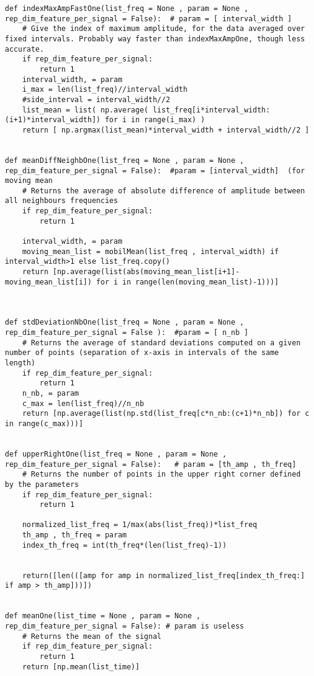\documentclass{article}
\begin{document}
\begin{lstlisting}
def indexMaxAmpFastOne(list_freq = None , param = None , rep_dim_feature_per_signal = False):  # param = [ interval_width ]
    # Give the index of maximum amplitude, for the data averaged over fixed intervals. Probably way faster than indexMaxAmpOne, though less accurate.
    if rep_dim_feature_per_signal:
        return 1
    interval_width, = param
    i_max = len(list_freq)//interval_width
    #side_interval = interval_width//2
    list_mean = list( np.average( list_freq[i*interval_width:(i+1)*interval_width]) for i in range(i_max) )
    return [ np.argmax(list_mean)*interval_width + interval_width//2 ]


def meanDiffNeighbOne(list_freq = None , param = None , rep_dim_feature_per_signal = False):  #param = [interval_width]  (for moving mean
    # Returns the average of absolute difference of amplitude between all neighbours frequencies
    if rep_dim_feature_per_signal:
        return 1
    
    interval_width, = param
    moving_mean_list = mobilMean(list_freq , interval_width) if interval_width>1 else list_freq.copy()
    return [np.average(list(abs(moving_mean_list[i+1]-moving_mean_list[i]) for i in range(len(moving_mean_list)-1)))]


    
def stdDeviationNbOne(list_freq = None , param = None , rep_dim_feature_per_signal = False ):  #param = [ n_nb ]
    # Returns the average of standard deviations computed on a given number of points (separation of x-axis in intervals of the same length)
    if rep_dim_feature_per_signal:
        return 1
    n_nb, = param
    c_max = len(list_freq)//n_nb
    return [np.average(list(np.std(list_freq[c*n_nb:(c+1)*n_nb]) for c in range(c_max)))]

    
def upperRightOne(list_freq = None , param = None , rep_dim_feature_per_signal = False):   # param = [th_amp , th_freq]
    # Returns the number of points in the upper right corner defined by the parameters
    if rep_dim_feature_per_signal:
        return 1
        
    normalized_list_freq = 1/max(abs(list_freq))*list_freq
    th_amp , th_freq = param
    index_th_freq = int(th_freq*(len(list_freq)-1))
    
    
    return([len(([amp for amp in normalized_list_freq[index_th_freq:] if amp > th_amp]))])
        

def meanOne(list_time = None , param = None , rep_dim_feature_per_signal = False): # param is useless
    # Returns the mean of the signal
    if rep_dim_feature_per_signal:
        return 1
    return [np.mean(list_time)]


\end{lstlisting}
\end{document}
